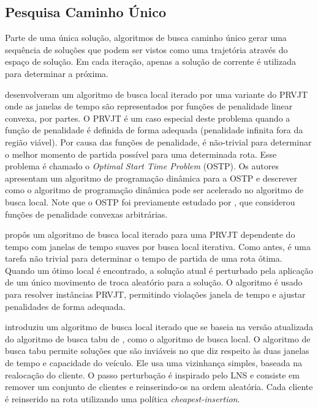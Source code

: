 \subsection{Pesquisa Caminho Único} 

Parte de uma única solução, algoritmos de busca caminho único gerar uma sequência de soluções que podem ser vistos como uma trajetória através do espaço de solução. Em cada iteração, apenas a solução de corrente é utilizada para determinar a próxima.
 
\cite{hashimoto_iterated_2008} desenvolveram um algoritmo de busca local iterado por uma variante do PRVJT onde as janelas de tempo são representados por funções de penalidade linear convexa, por partes. O PRVJT é um caso especial deste problema quando a função de penalidade é definida de forma adequada (penalidade infinita fora da região viável). Por causa das funções de penalidade, é não-trivial para determinar o melhor momento de partida possível para uma determinada rota. Esse problema é chamado o \textit{Optimal Start Time Problem} (OSTP). Os autores apresentam um algoritmo de programação dinâmica para a OSTP e descrever como o algoritmo de programação dinâmica pode ser acelerado no algoritmo de busca local. Note que o OSTP foi previamente estudado por \cite{Desrochers88}, que considerou funções de penalidade convexas arbitrárias.


 
\cite{hashimoto_iterated_2008} propôs um algoritmo de busca local iterado para uma PRVJT dependente do tempo com janelas de tempo suaves por busca local iterativa. Como antes, é uma tarefa não trivial para determinar o tempo de partida de uma rota ótima. Quando um ótimo local é encontrado, a solução atual é perturbado pela aplicação de um único movimento de troca aleatório para a solução. O algoritmo é usado para resolver instâncias PRVJT, permitindo violações janela de tempo e ajustar penalidades de forma adequada.
 
 
\cite{cordeau2011} introduziu um algoritmo de busca local iterado que se baseia na versão atualizada do algoritmo de busca tabu de \cite{cordeau04}, como o algoritmo de busca local. O algoritmo de busca tabu permite soluções que são inviáveis no que diz respeito às duas janelas de tempo e capacidade do veículo. Ele usa uma vizinhança simples, baseada na realocação do cliente. O passo perturbação é inspirado pelo LNS e consiste em remover um conjunto de clientes e reinserindo-os na ordem aleatória. Cada cliente é reinserido na rota utilizando uma política \textit{cheapest-insertion}.

